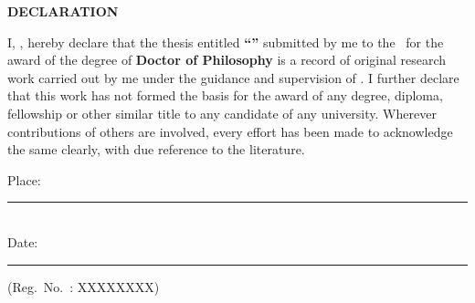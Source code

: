 \thispagestyle{empty}
\begin{center}
{\large \bfseries DECLARATION}
\end{center}
\vspace{1cm}

\noindent
I, \researcher, hereby declare that the thesis entitled
\textbf{``\thesistitle''} submitted by me to the \institution\ for
the award of the degree of \textbf{Doctor of Philosophy} is a record
of original research work carried out by me under the guidance and
supervision of \supervisor. I further declare that this work has not
formed the basis for the award of any degree, diploma, fellowship or
other similar title to any candidate of any university.  Wherever
contributions of others are involved, every effort has been made to
acknowledge the same clearly, with due reference to the literature.

\vspace{2.5cm}
\noindent
Place: \rule{4cm}{0.4pt}\hfill \textbf{\researcher}\\[0.3cm]
Date: \rule{4cm}{0.4pt}\hfill (Reg.\ No.\ : XXXXXXXX)
\clearpage
